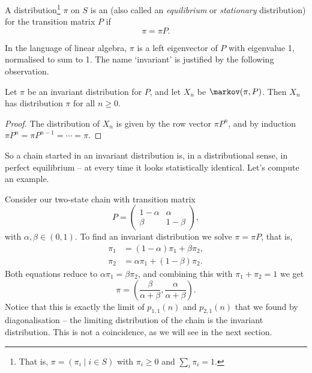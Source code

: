 \documentclass[a4paper]{scrartcl}
\begin{document}
\begin{definition}
	A distribution\footnote{That is, $\pi = (\pi_i \mid i \in S)$ with $\pi_i \geq 0$ and $\sum_i \pi_i = 1$.} $\pi$ on $S$ is an  (also called an \emph{equilibrium} or \emph{stationary} distribution) for the transition matrix $P$ if
	$$
	\pi = \pi P.
	$$
\end{definition}

In the language of linear algebra, $\pi$ is a left eigenvector of $P$ with eigenvalue 1, normalised to sum to 1. The name `invariant' is justified by the following observation.

\begin{proposition}
	Let $\pi$ be an invariant distribution for $P$, and let $X_n$ be $\markov(\pi, P)$. Then $X_n$ has distribution $\pi$ for all $n \geq 0$.
\end{proposition}
\begin{proof}
	The distribution of $X_n$ is given by the row vector $\pi P^n$, and by induction $\pi P^n = \pi P^{n - 1} = \cdots = \pi$.
\end{proof}

So a chain started in an invariant distribution is, in a distributional sense, in perfect equilibrium -- at every time it looks statistically identical. Let's compute an example.

\begin{example}
	Consider our two-state chain with transition matrix
	$$
	P = \begin{pmatrix}
		1 - \alpha & \alpha \\
		\beta & 1 - \beta
	\end{pmatrix},
	$$
	with $\alpha, \beta \in (0, 1)$. To find an invariant distribution we solve $\pi = \pi P$, that is,
	\begin{align*}
		\pi_1 &= (1 - \alpha)\pi_1 + \beta \pi_2, \\
		\pi_2 &= \alpha \pi_1 + (1 - \beta) \pi_2.
	\end{align*}
	Both equations reduce to $\alpha \pi_1 = \beta \pi_2$, and combining this with $\pi_1 + \pi_2 = 1$ we get
	$$
	\pi = \left(\frac{\beta}{\alpha + \beta}, \frac{\alpha}{\alpha + \beta}\right).
	$$
	Notice that this is exactly the limit of $p_{1, 1}(n)$ and $p_{2, 1}(n)$ that we found by diagonalisation -- the limiting distribution of the chain is the invariant distribution. This is not a coincidence, as we will see in the next section.
\end{example}
\end{document}
